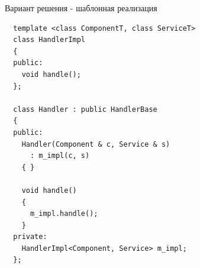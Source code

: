 \documentclass[unknownkeysallowed,xcolor=table]{beamer}
\begin{document}
\begin{frame}[fragile]{Вариант решения - шаблонная реализация}
  \begin{lstlisting}
  template <class ComponentT, class ServiceT>
  class HandlerImpl
  {
  public:
    void handle();
  };

  class Handler : public HandlerBase
  {
  public:
    Handler(Component & c, Service & s)
      : m_impl(c, s)
    { }

    void handle()
    {
      m_impl.handle();
    }
  private:
    HandlerImpl<Component, Service> m_impl;
  };
  \end{lstlisting}
\end{frame}
\end{document}

